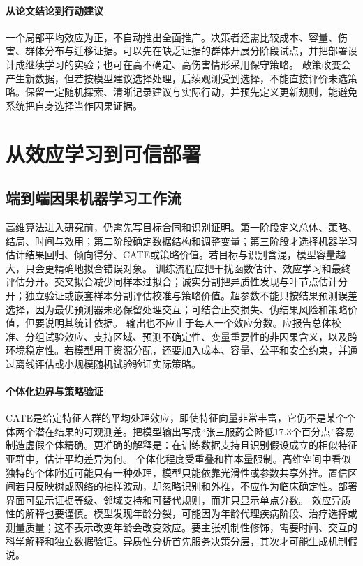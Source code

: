 \paragraph{从论文结论到行动建议}

一个局部平均效应为正，不自动推出全面推广。决策者还需比较成本、容量、伤害、群体分布与迁移证据。可以先在缺乏证据的群体开展分阶段试点，并把部署设计成继续学习的实验；也可在高不确定、高伤害情形采用保守策略。
政策改变会产生新数据，但若按模型建议选择处理，后续观测受到选择，不能直接评价未选策略。保留一定随机探索、清晰记录建议与实际行动，并预先定义更新规则，能避免系统把自身选择当作因果证据。

\section{从效应学习到可信部署}

\subsection{端到端因果机器学习工作流}

高维算法进入研究前，仍需先写目标合同和识别证明。第一阶段定义总体、策略、结局、时间与效用；第二阶段确定数据结构和调整变量；第三阶段才选择机器学习估计结果回归、倾向得分、CATE或策略价值。若目标与识别含混，模型容量越大，只会更精确地拟合错误对象。
训练流程应把干扰函数估计、效应学习和最终评估分开。交叉拟合减少同样本过拟合；诚实分割把异质性发现与叶节点估计分开；独立验证或嵌套样本分割评估校准与策略价值。超参数不能只按结果预测误差选择，因为最优预测器未必保留处理交互；可结合正交损失、伪结果风险和策略价值，但要说明其统计依据。
输出也不应止于每人一个效应分数。应报告总体校准、分组试验效应、支持区域、预测不确定性、变量重要性的非因果含义，以及跨环境稳定性。若模型用于资源分配，还要加入成本、容量、公平和安全约束，并通过离线评估或小规模随机试验验证实际策略。

\paragraph{个体化边界与策略验证}

CATE是给定特征人群的平均处理效应，即使特征向量非常丰富，它仍不是某个个体两个潜在结果的可观测差。把模型输出写成“张三服药会降低17.3个百分点”容易制造虚假个体精确。更准确的解释是：在训练数据支持且识别假设成立的相似特征亚群中，估计平均差异为何。
个体化程度受重叠和样本量限制。高维空间中看似独特的个体附近可能只有一种处理，模型只能依靠光滑性或参数共享外推。置信区间若只反映树或网络的抽样波动，却忽略识别和外推，不应作为临床确定性。部署界面可显示证据等级、邻域支持和可替代规则，而非只显示单点分数。
效应异质性的解释也要谨慎。模型发现年龄分裂，可能因为年龄代理疾病阶段、治疗选择或测量质量；这不表示改变年龄会改变效应。要主张机制性修饰，需要时间、交互的科学解释和独立数据验证。异质性分析首先服务决策分层，其次才可能生成机制假说。


